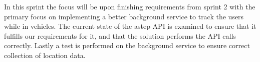 In this sprint the focus will be upon finishing requirements from  sprint 2 with the primary focus on implementing a better background service to track the users while in vehicles.
The current state of the \gls{astep} API is examined to ensure that it fulfills our requirements for it, and that the solution performs the API calls correctly.
Lastly a test is performed on the background service to ensure correct collection of location data.